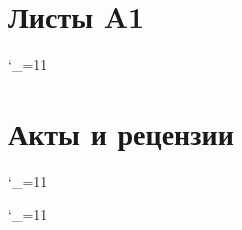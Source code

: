 %
%

\appendix

\renewcommand{\theequation}{\thechapter.\arabic{equation}}
\renewcommand{\thefigure}{\thechapter.\arabic{figure}}
\renewcommand{\thetable}{\thechapter.\arabic{table}}
\renewcommand{\appendixname}{ПРИЛОЖЕНИЯ}
\def\chaptername{ПРИЛОЖЕНИЕ}
\def\thechapter{\Asbuk{chapter}\unskip}
\renewcommand{\thesection}{\thechapter.\arabic{section}\unskip}
\fancyhead[C]{\thepage \\ \textbf{\leftmark}}
\fancyfoot[C]{}
\chapter{Листы A1}\label{apx_a1}

{\catcode`\_=11
\newpage

}

%
\chapter{Акты и рецензии}\label{apx_acts_reviews}

{\catcode`\_=11
\newpage

}

{\catcode`\_=11
\newpage

}




